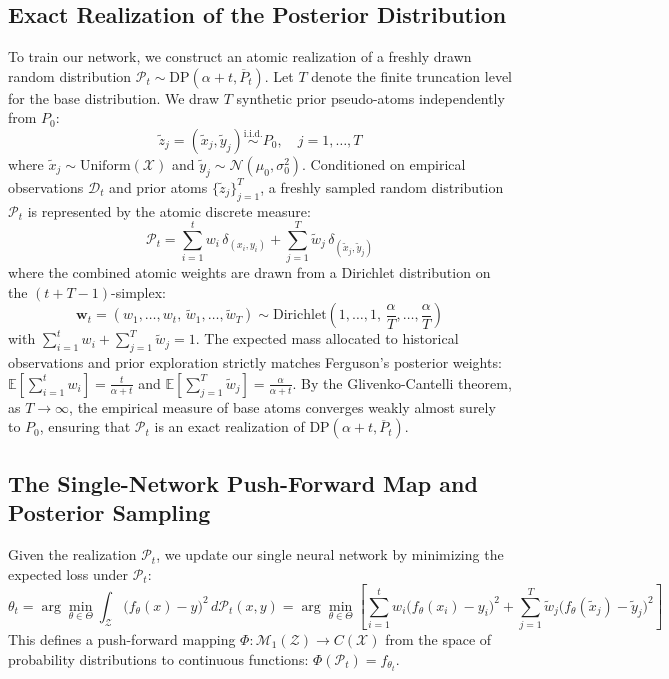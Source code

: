 \documentclass{article}
\begin{document}
\subsection{Exact Realization of the Posterior Distribution}
To train our network, we construct an atomic realization of a freshly drawn random distribution $\mathcal{P}_t \sim \mathrm{DP}(\alpha + t, \overline{P}_t)$. Let $T$ denote the finite truncation level for the base distribution. We draw $T$ synthetic prior pseudo-atoms independently from $P_0$:
\begin{equation}
\label{eq:prior_atoms}
\tilde{z}_j = (\tilde{x}_j, \tilde{y}_j) \stackrel{\text{i.i.d.}}{\sim} P_0, \quad j = 1, \dots, T
\end{equation}
where $\tilde{x}_j \sim \mathrm{Uniform}(\mathcal{X})$ and $\tilde{y}_j \sim \mathcal{N}(\mu_0, \sigma_0^2)$. Conditioned on empirical observations $\mathcal{D}_t$ and prior atoms $\{\tilde{z}_j\}_{j=1}^T$, a freshly sampled random distribution $\mathcal{P}_t$ is represented by the atomic discrete measure:
\begin{equation}
\label{eq:random_measure}
\mathcal{P}_t = \sum_{i=1}^t w_i \, \delta_{(x_i, y_i)} + \sum_{j=1}^T \widetilde{w}_j \, \delta_{(\tilde{x}_j, \tilde{y}_j)}
\end{equation}
where the combined atomic weights are drawn from a Dirichlet distribution on the $(t + T - 1)$-simplex:
\begin{equation}
\label{eq:dirichlet_draw}
\mathbf{w}_t = \left(w_1, \dots, w_t, \, \widetilde{w}_1, \dots, \widetilde{w}_T\right) \sim \mathrm{Dirichlet}\left(1, \dots, 1, \, \frac{\alpha}{T}, \dots, \frac{\alpha}{T}\right)
\end{equation}
with $\sum_{i=1}^t w_i + \sum_{j=1}^T \widetilde{w}_j = 1$. The expected mass allocated to historical observations and prior exploration strictly matches Ferguson's posterior weights: $\mathbb{E}[\sum_{i=1}^t w_i] = \frac{t}{\alpha + t}$ and $\mathbb{E}[\sum_{j=1}^T \widetilde{w}_j] = \frac{\alpha}{\alpha + t}$. By the Glivenko-Cantelli theorem, as $T \to \infty$, the empirical measure of base atoms converges weakly almost surely to $P_0$, ensuring that $\mathcal{P}_t$ is an exact realization of $\mathrm{DP}(\alpha + t, \overline{P}_t)$.

\subsection{The Single-Network Push-Forward Map and Posterior Sampling}
Given the realization $\mathcal{P}_t$, we update our single neural network by minimizing the expected loss under $\mathcal{P}_t$:
\begin{equation}
\label{eq:risk_min}
\theta_t = \arg\min_{\theta \in \Theta} \int_{\mathcal{Z}} \big(f_\theta(x) - y\big)^2 \, d\mathcal{P}_t(x, y) = \arg\min_{\theta \in \Theta} \left[ \sum_{i=1}^t w_i \big(f_\theta(x_i) - y_i\big)^2 + \sum_{j=1}^T \widetilde{w}_j \big(f_\theta(\tilde{x}_j) - \tilde{y}_j\big)^2 \right]
\end{equation}
This defines a push-forward mapping $\Phi: \mathcal{M}_1(\mathcal{Z}) \to C(\mathcal{X})$ from the space of probability distributions to continuous functions: $\Phi(\mathcal{P}_t) = f_{\theta_t}$.
\end{document}
